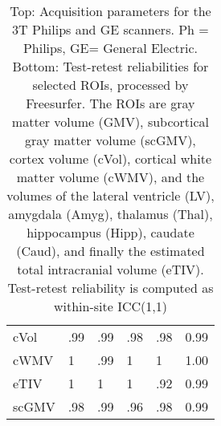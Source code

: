 \begin{table}
{\begin{tabular}{llllll}
cVol                  &                   .99 &                        .99 &                  .98 &               .98 &                 0.99 \\
cWMV                  &                   1 &                        .99 &                  1 &               1 &                 1.00 \\
eTIV                  &                   1 &                        1 &                  1 &               .92 &                 0.99 \\
scGMV                 &                   .98 &                        .99 &                  .96 &               .98 &                 0.99 \\
\bottomrule
\end{tabular}}
\fi
\caption{Top: Acquisition parameters for the 3T Philips and GE scanners. Ph = Philips, GE= General Electric. Bottom: Test-retest reliabilities for selected ROIs, processed by Freesurfer. The ROIs are gray matter volume (GMV), subcortical gray matter volume (scGMV), cortex volume (cVol), cortical white matter volume (cWMV), and the volumes of the lateral ventricle (LV), amygdala (Amyg), thalamus (Thal), hippocampus (Hipp), caudate (Caud), and finally the estimated total intracranial volume (eTIV). Test-retest reliability is computed as within-site ICC(1,1)} 
\label{tab:acquisition1}

\end{table}